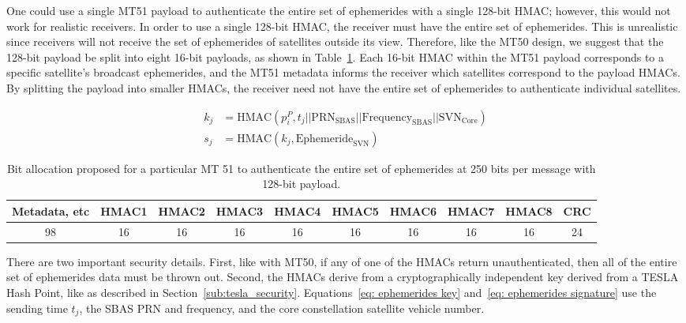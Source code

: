 \documentclass[letterpaper,times]{IONconf/IONconf}
\begin{document}
		One could use a single MT51 payload to authenticate the entire set of ephemerides with a single 128-bit HMAC; however, this would not work for realistic receivers.
		In order to use a single 128-bit HMAC, the receiver must have the entire set of ephemerides.
		This is unrealistic since receivers will not receive the set of ephemerides of satellites outside its view.
		Therefore, like the MT50 design, we suggest that the 128-bit payload be split into eight 16-bit payloads, as shown in Table~\ref{tab: nma}.
		Each 16-bit HMAC within the MT51 payload corresponds to a specific satellite's broadcast ephemerides, and the MT51 metadata informs the receiver which satellites correspond to the payload HMACs.
		By splitting the payload into smaller HMACs, the receiver need not have the entire set of ephemerides to authenticate individual satellites.

		\begin{align}
			k_j &= \textrm{HMAC}(p^P_i, t_j || \textrm{PRN}_\textrm{SBAS} || \textrm{Frequency}_\textrm{SBAS} || \textrm{SVN}_\textrm{Core} \label{eq: ephemerides key}) \\
			s_j &= \textrm{HMAC}(k_j, \textrm{Ephemeride}_{\textrm{SVN}}) \label{eq: ephemerides signature}
		\end{align}

		\begin{table}
			\center
			\begin{tabular}{|c|c|c|c|c|c|c|c|c|c|} \hline
				Metadata, etc & HMAC1 & HMAC2 & HMAC3 & HMAC4 & HMAC5 & HMAC6 & HMAC7 & HMAC8 & CRC \\ \hline
				98 & 16 & 16 & 16 & 16& 16 & 16 & 16 & 16 & 24 \\ \hline
			\end{tabular}
			\caption{Bit allocation proposed for a particular MT 51 to authenticate the entire set of ephemerides at 250 bits per message with 128-bit payload.}
			\label{tab: nma}
		\end{table}

		There are two important security details.
		First, like with MT50, if any of one of the HMACs return unauthenticated, then all of the entire set of ephemerides data must be thrown out.
		Second, the HMACs derive from a cryptographically independent key derived from a TESLA Hash Point, like as described in Section~\ref{sub:tesla_security}.
		Equations~\eqref{eq: ephemerides key} and~\eqref{eq: ephemerides signature} use the sending time $t_j$, the SBAS PRN and frequency, and the core constellation satellite vehicle number.
\end{document}
